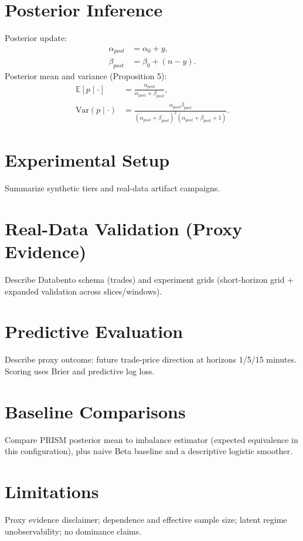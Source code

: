 \documentclass[11pt]{article}
\begin{document}
\section{Posterior Inference}
Posterior update:
\begin{align}
 \alpha_{post} &= \alpha_0 + y,\\
 \beta_{post} &= \beta_0 + (n-y).
\end{align}
Posterior mean and variance (Proposition 5):
\begin{align}
 \mathbb{E}[p\mid \cdot] &= \frac{\alpha_{post}}{\alpha_{post}+\beta_{post}},\\
 \mathrm{Var}(p\mid \cdot) &= \frac{\alpha_{post}\beta_{post}}{ (\alpha_{post}+\beta_{post})^2(\alpha_{post}+\beta_{post}+1)}.
\end{align}

\section{Experimental Setup}
Summarize synthetic tiers and real-data artifact campaigns.

\section{Real-Data Validation (Proxy Evidence)}
Describe Databento schema (trades) and experiment grids (short-horizon grid + expanded validation across slices/windows).

\section{Predictive Evaluation}
Describe proxy outcome: future trade-price direction at horizons 1/5/15 minutes. Scoring uses Brier and predictive log loss.

\section{Baseline Comparisons}
Compare PRISM posterior mean to imbalance estimator (expected equivalence in this configuration), plus naive Beta baseline and a descriptive logistic smoother.

\section{Limitations}
Proxy evidence disclaimer; dependence and effective sample size; latent regime unobservability; no dominance claims.
\end{document}
